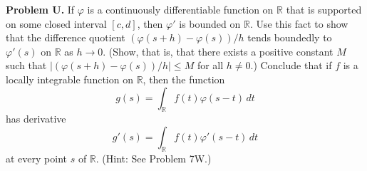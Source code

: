 \textbf{Problem U.} If $\varphi$ is a continuously differentiable function on $\mathbb{R}$ that is supported on some closed interval $[c, d]$, then $\varphi'$ is bounded on $\mathbb{R}$. Use this fact to show that the difference quotient $(\varphi(s + h) - \varphi(s))/h$ tends boundedly to $\varphi'(s)$ on $\mathbb{R}$ as $h \to 0$. (Show, that is, that there exists a positive constant $M$ such that $|(\varphi(s + h) - \varphi(s))/h| \leq M$ for all $h \neq 0$.) Conclude that if $f$ is a locally integrable function on $\mathbb{R}$, then the function
$$g(s) = \int_{\mathbb{R}} f(t) \varphi(s - t) \, dt$$
has derivative
$$g'(s) = \int_{\mathbb{R}} f(t) \varphi'(s - t) \, dt$$
at every point $s$ of $\mathbb{R}$. (Hint: See Problem 7W.)
